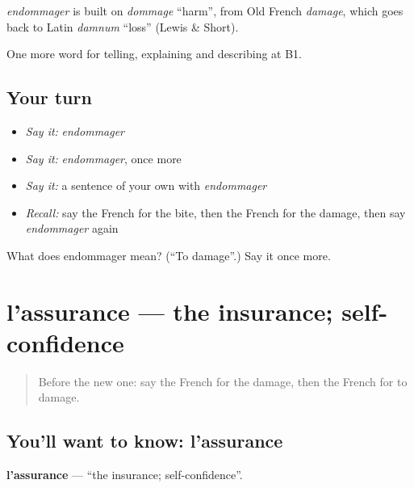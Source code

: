 \begin{cousinweb}
\emph{endommager} is built on \emph{dommage} \textquotedblleft{}harm\textquotedblright{}, from Old French \emph{damage}, which goes back to Latin \emph{damnum} \textquotedblleft{}loss\textquotedblright{} (Lewis \& Short).
\end{cousinweb}

\begin{grammarlens}[title={What you've built}]
One more word for telling, explaining and describing at B1.
\end{grammarlens}

\subsection*{Your turn}
\begin{itemize}
\raggedright
  \item \emph{Say it:} \emph{endommager}
  \item \emph{Say it:} \emph{endommager}, once more
  \item \emph{Say it:} a sentence of your own with \emph{endommager}
  \item \emph{Recall:} say the French for the bite, then the French for the damage, then say \emph{endommager} again
\end{itemize}

\begin{tcolorbox}[breakable,colback=teal!4,colframe=teal!35!black,title={Before you move on}]
What does endommager mean? (\textquotedblleft{}To damage\textquotedblright{}.) Say it once more.
\end{tcolorbox}
\section[l'assurance]{l'assurance — the insurance; self-confidence}

\label{lesson:FR-C307-assurance}



\begin{quote}
Before the new one: say the French for the damage, then the French for to damage.
\end{quote}

\subsection*{You'll want to know: l'assurance}
\textbf{l'assurance} — \textquotedblleft{}the insurance; self-confidence\textquotedblright{}.


